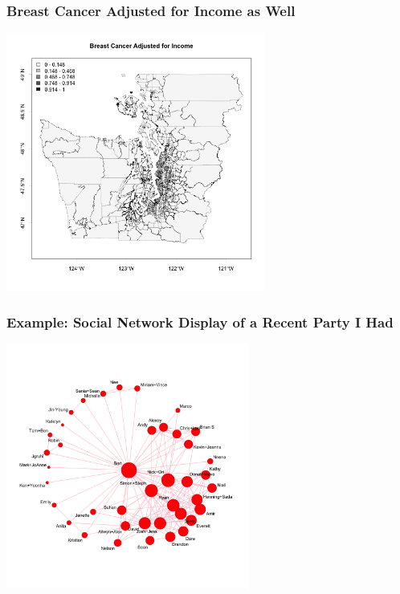 \documentclass[slides]{beamer}
\begin{document}
\begin{frame}[fragile]
\frametitle{Breast Cancer Adjusted for Income as Well}
\begin{center}
\includegraphics[width=8.5cm]{figure/breast_new.png}
\end{center}
\end{frame}


\begin{frame}[fragile]
\frametitle{Example: Social Network Display of a Recent Party I Had}
\begin{center}
\includegraphics[width=8cm]{figure/network.png}
\end{center}
\end{frame}
\end{document}
